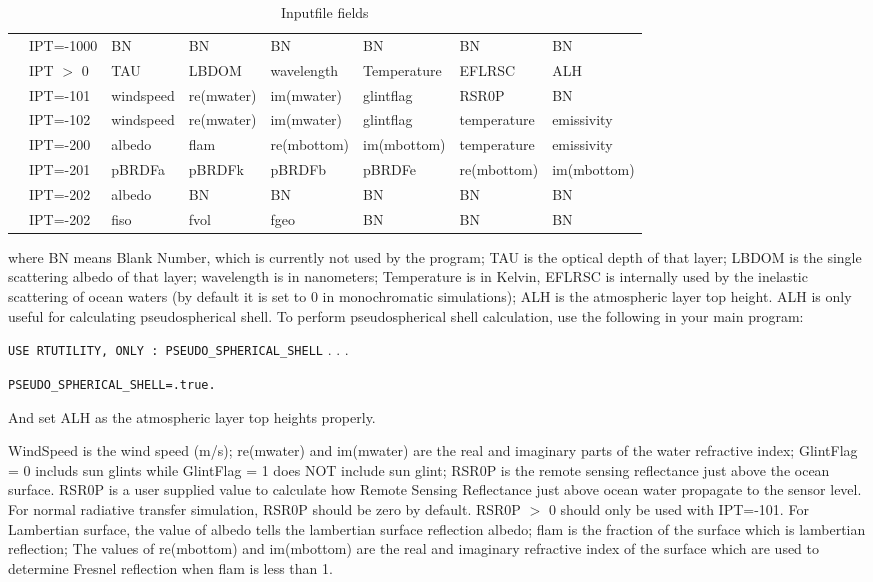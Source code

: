 \documentclass[10pt,letterpaper]{article}
\begin{document}
\begin{table}
\caption{Inputfile fields}
\vspace{0.2 in}
\centering
\begin{tabular}{llllllll}
&IPT=-1000 & BN&BN&BN& BN&BN&BN \\
&IPT $>$ 0 &TAU&LBDOM&wavelength&Temperature&EFLRSC&ALH \\
&IPT=-101  & windspeed & re(mwater) & im(mwater) & glintflag & RSR0P & BN \\
&IPT=-102 & windspeed& re(mwater)& im(mwater)&glintflag&temperature&emissivity \\
&IPT=-200 & albedo &flam&re(mbottom)&im(mbottom)&temperature&emissivity \\
&IPT=-201 & pBRDFa&pBRDFk&pBRDFb&pBRDFe&re(mbottom)&im(mbottom) \\
&IPT=-202  & albedo& BN& BN& BN& BN& BN \\
&IPT=-202  & fiso &fvol & fgeo & BN & BN& BN \\
\end{tabular}
\label{tab:InputFile}
\end{table}
where BN means Blank Number, which is currently not used by the program; TAU is the optical depth of that layer; LBDOM is the single scattering albedo of that layer; wavelength is in nanometers; Temperature is in Kelvin, EFLRSC is internally used by the inelastic scattering of ocean waters (by default it is set to 0 in monochromatic simulations); ALH is the atmospheric layer top height. ALH is only useful for calculating pseudospherical shell. To perform pseudospherical shell calculation, use the following in your main program:


\verb!USE RTUTILITY, ONLY : PSEUDO_SPHERICAL_SHELL!
.
.
.

\verb!PSEUDO_SPHERICAL_SHELL=.true.!

And set ALH as the atmospheric layer top heights properly.

WindSpeed is the wind speed (m/s); re(mwater) and im(mwater) are the real and imaginary parts of the water refractive index; GlintFlag = 0 includs sun glints while  GlintFlag = 1 does NOT include sun glint; RSR0P is the remote sensing reflectance just above the ocean surface. RSR0P is a user supplied value to calculate how Remote Sensing Reflectance just above ocean water propagate to the sensor level. For normal radiative transfer simulation, RSR0P should be zero by default. RSR0P $>$ 0 should only be used with IPT=-101. 
For Lambertian surface, the value of  albedo tells the lambertian surface reflection albedo;  flam is the fraction of the surface which is lambertian reflection; The values of re(mbottom) and im(mbottom) are the real and imaginary refractive index of the surface which are used to determine Fresnel reflection when flam is less than 1. 
\end{document}
